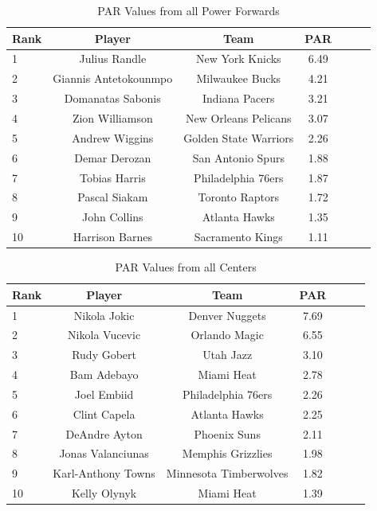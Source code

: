 \documentclass[12pt]{article}
\begin{document}
\begin{table}[H]
  \caption{PAR Values from all Power Forwards}
  \label{tab:PFtable}
\centering
\begin{tabular}[t]{lcccccc}
  \toprule
  Rank & Player & Team & PAR\\
  \midrule
 1 & Julius Randle & New York Knicks & 6.49\\
 2 & Giannis Antetokounmpo & Milwaukee Bucks & 4.21\\
 3 & Domanatas Sabonis & Indiana Pacers & 3.21\\
 4 & Zion Williamson & New Orleans Pelicans & 3.07\\
 5 & Andrew Wiggins & Golden State Warriors & 2.26\\
 6 & Demar Derozan & San Antonio Spurs & 1.88\\
 7 & Tobias Harris & Philadelphia 76ers & 1.87\\
 8 & Pascal Siakam & Toronto Raptors & 1.72\\
 9 & John Collins & Atlanta Hawks & 1.35\\
 10 & Harrison Barnes & Sacramento Kings & 1.11\\
  \bottomrule
\end{tabular}
\end{table}

\begin{table}[H]
  \caption{PAR Values from all Centers}
  \label{tab:Ctable}
\centering
\begin{tabular}[t]{lcccccc}
  \toprule
  Rank & Player & Team & PAR\\
  \midrule
 1 & Nikola Jokic & Denver Nuggets & 7.69\\
 2 & Nikola Vucevic & Orlando Magic & 6.55\\
 3 & Rudy Gobert & Utah Jazz & 3.10\\
 4 & Bam Adebayo & Miami Heat & 2.78\\
 5 & Joel Embiid & Philadelphia 76ers & 2.26\\
 6 & Clint Capela & Atlanta Hawks & 2.25\\
 7 & DeAndre Ayton & Phoenix Suns & 2.11\\
 8 & Jonas Valanciunas & Memphis Grizzlies & 1.98\\
 9 & Karl-Anthony Towns & Minnesota Timberwolves & 1.82\\
 10 & Kelly Olynyk & Miami Heat & 1.39\\
  \bottomrule
\end{tabular}
\end{table}
\end{document}
